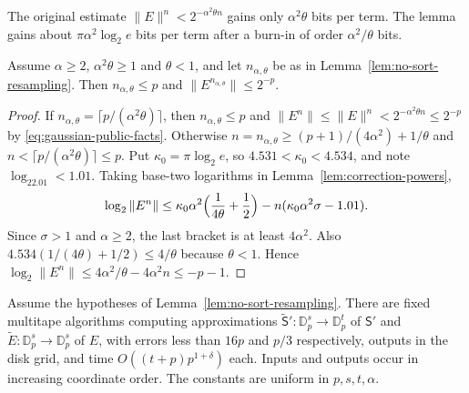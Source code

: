 The original estimate $\|E\|^n<2^{-\alpha^2\theta n}$ gains only
$\alpha^2\theta$ bits per term. The lemma gains about
$\pi\alpha^2\log_2e$ bits per term after a burn-in of order
$\alpha^2/\theta$ bits.

\begin{corollary}
\label{cor:neumann-count}
Assume $\alpha\geq2$, $\alpha^2\theta\geq1$ and $\theta<1$, and let
$n_{\alpha,\theta}$ be as in Lemma~\ref{lem:no-sort-resampling}.
Then $n_{\alpha,\theta}\leq p$ and $\|E^{n_{\alpha,\theta}}\|\leq2^{-p}$.
\end{corollary}

\begin{proof}
If $n_{\alpha,\theta}=\lceil p/(\alpha^2\theta)\rceil$, then
$n_{\alpha,\theta}\le p$ and $\|E^{n}\|\le\|E\|^n<2^{-\alpha^2\theta n}\le2^{-p}$
by \eqref{eq:gaussian-public-facts}. Otherwise
$n=n_{\alpha,\theta}\geq(p+1)/(4\alpha^2)+1/\theta$ and $n<\lceil p/(\alpha^2\theta)\rceil\le p$.
Put $\kappa_0=\pi\log_2e$, so $4.531<\kappa_0<4.534$, and note
$\log_22.01<1.01$. Taking base-two logarithms in
Lemma~\ref{lem:correction-powers},
\[
 \log_2\|E^n\|\leq\kappa_0\alpha^2\Bigl(\frac1{4\theta}+\frac12\Bigr)
   -n(\kappa_0\alpha^2\sigma-1.01).
\]
Since $\sigma>1$ and $\alpha\ge2$, the last bracket is at least
$4\alpha^2$. Also $4.534(1/(4\theta)+1/2)\le4/\theta$ because
$\theta<1$. Hence
$\log_2\|E^n\|\leq4\alpha^2/\theta-4\alpha^2n\leq-p-1$.
\end{proof}

\begin{lemma}
\label{lem:chirped-gaussian}
Assume the hypotheses of Lemma~\ref{lem:no-sort-resampling}. There are
fixed multitape algorithms computing approximations
$\widetilde{\mathsf S}':\mathbb D_p^s\to\mathbb D_p^t$ of $\mathsf S'$
and $\widetilde E:\mathbb D_p^s\to\mathbb D_p^s$ of $E$, with errors less
than $16p$ and $p/3$ respectively, outputs in the disk grid, and time
$O((t+p)p^{1+\delta})$ each. Inputs and outputs occur in increasing
coordinate order. The constants are uniform in $p,s,t,\alpha$.
\end{lemma}

